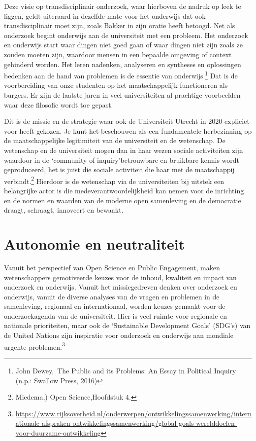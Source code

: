 \documentclass[empirical, authordate, ]{new-jote-article}
\begin{document}
	Deze visie op transdisciplinair onderzoek, waar hierboven de nadruk op leek te liggen, geldt uiteraard in dezelfde mate voor het onderwijs dat ook transdisciplinair moet zijn, zoals Bakker in zijn oratie heeft betoogd. Net als onderzoek begint onderwijs aan de universiteit met een probleem. Het onderzoek en onderwijs start waar dingen niet goed gaan of waar dingen niet zijn zoals ze zouden moeten zijn, waardoor mensen in een bepaalde omgeving of context gehinderd worden. Het leren nadenken, analyseren en syntheses en oplossingen bedenken aan de hand van problemen is de essentie van onderwijs.\footnote{John Dewey, The Public and its Problems: An Essay in Political Inquiry (n.p.: Swallow Press, 2016)} Dat is de voorbereiding van onze studenten op het maatschappelijk functioneren als burgers. Er zijn de laatste jaren in veel universiteiten al prachtige voorbeelden waar deze filosofie wordt toe gepast.



	Dit is de missie en de strategie waar ook de Universiteit Utrecht in 2020 expliciet voor heeft gekozen. Je kunt het beschouwen als een fundamentele herbezinning op de maatschappelijke legitimiteit van de universiteit en de wetenschap. De wetenschap en de universiteit mogen dan in haar wezen sociale activiteiten zijn waardoor in de ‘community of inquiry'betrouwbare en bruikbare kennis wordt geproduceerd, het is juist die sociale activiteit die haar met de maatschappij verbindt.\footnote{Miedema,) Open Science,Hoofdstuk 4.} Hierdoor is de wetenschap via de universiteiten bij uitstek een belangrijke actor is die medeverantwoordelijkheid kan nemen voor de inrichting en de normen en waarden van de moderne open samenleving en de democratie draagt, schraagt, innoveert en bewaakt.



	\section{Autonomie en neutraliteit}



	Vanuit het perspectief van Open Science en Public Engagement, maken wetenschappers gemotiveerde keuzes voor de inhoud, kwaliteit en impact van onderzoek en onderwijs. Vanuit het missiegedreven denken over onderzoek en onderwijs, vanuit de diverse analyses van de vragen en problemen in de samenleving, regionaal en internationaal, worden keuzes gemaakt voor de onderzoekagenda van de universiteit. Hier is veel ruimte voor regionale en nationale prioriteiten, maar ook de ‘Sustainable Development Goals' (SDG's) van de United Nations zijn inspiratie voor onderzoek en onderwijs aan mondiale urgente problemen.\footnote{\href{about:blank}{https://www.rijksoverheid.nl/onderwerpen/ontwikkelingssamenwerking/internationale-afspraken-ontwikkelingssamenwerking/global-goals-werelddoelen-voor-duurzame-ontwikkeling}}
\end{document}
